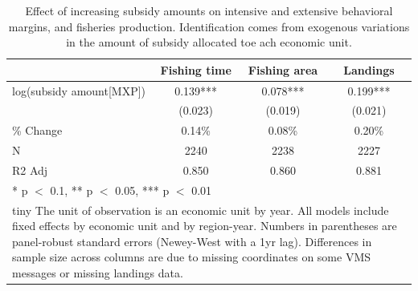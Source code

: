 \begin{table}
\centering
\caption{\label{tab:elasticity}Effect of increasing subsidy amounts on intensive and extensive behavioral margins, and fisheries production. Identification comes from exogenous variations in the amount of subsidy allocated toe ach economic unit.}
\centering
\begin{tabular}[t]{lccc}
\toprule
  & Fishing time & Fishing area & Landings\\
\midrule
log(subsidy amount[MXP]) & \num{0.139}*** & \num{0.078}*** & \num{0.199}***\\
 & (\num{0.023}) & (\num{0.019}) & (\num{0.021})\\
\midrule
\% Change & 0.14\% & 0.08\% & 0.20\%\\
N & \num{2240} & \num{2238} & \num{2227}\\
R2 Adj & \num{0.850} & \num{0.860} & \num{0.881}\\
\bottomrule
\multicolumn{4}{l}{\rule{0pt}{1em}* p $<$ 0.1, ** p $<$ 0.05, *** p $<$ 0.01}\\
\multicolumn{4}{l}{\rule{0pt}{1em}tiny The unit of observation is an economic unit by year. All models include fixed effects by economic unit and by region-year. Numbers in parentheses are panel-robust standard errors (Newey-West with a 1yr lag). Differences in sample size across columns are due to missing coordinates on some VMS messages or missing landings data.}\\
\end{tabular}
\end{table}

